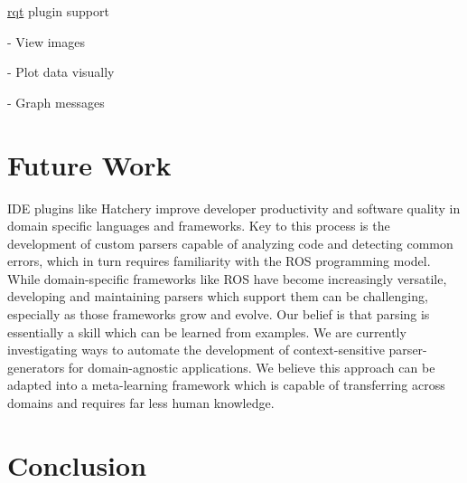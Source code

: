 \begin{multicols}{2}
\begin{todolist}
\begin{todolist}
\end{todolist}
\item \href{https://wiki.ros.org/rqt}{rqt} plugin support
\begin{todolist}
\item[\done] \href{https://wiki.ros.org/rqt_image_view}{} - View images
\item[\done] \href{https://wiki.ros.org/rqt_plot}{} - Plot data visually
\item[\done] \href{https://wiki.ros.org/rqt_graph}{} - Graph messages
\end{todolist}
\end{todolist}
\end{multicols}

\section{Future Work}

IDE plugins like Hatchery improve developer productivity and software quality in domain specific languages and frameworks. Key to this process is the development of custom parsers capable of analyzing code and detecting common errors, which in turn requires familiarity with the ROS programming model. While domain-specific frameworks like ROS have become increasingly versatile, developing and maintaining parsers which support them can be challenging, especially as those frameworks grow and evolve. Our belief is that parsing is essentially a skill which can be learned from examples. We are currently investigating ways to automate the development of context-sensitive parser-generators for domain-agnostic applications. We believe this approach can be adapted into a meta-learning framework which is capable of transferring across domains and requires far less human knowledge.

\section{Conclusion}

